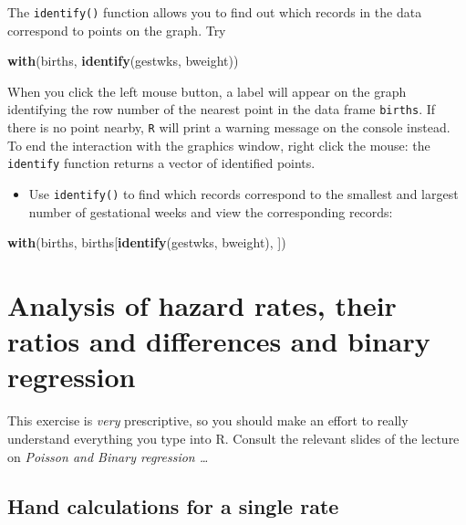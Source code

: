 \documentclass[
]{book}
\newenvironment{Shaded}{\begin{snugshade}}{\end{snugshade}}
\newcommand{\FunctionTok}[1]{\textcolor[rgb]{0.13,0.29,0.53}{\textbf{#1}}}
\newcommand{\NormalTok}[1]{#1}
\providecommand{\tightlist}{%
  \setlength{\itemsep}{0pt}\setlength{\parskip}{0pt}}
\begin{document}
The \texttt{identify()} function allows you to find out which records
in the data correspond to points on the graph. Try

\begin{Shaded}
\begin{Highlighting}[]
\FunctionTok{with}\NormalTok{(births, }\FunctionTok{identify}\NormalTok{(gestwks, bweight))}
\end{Highlighting}
\end{Shaded}

When you click the left mouse button, a label will appear on the graph
identifying the row number of the nearest point in the data frame
\texttt{births}. If there is no point nearby, \texttt{R} will print a warning
message on the console instead. To end the interaction with the
graphics window, right click the mouse: the \texttt{identify} function
returns a vector of identified points.

\begin{itemize}
\tightlist
\item
  Use \texttt{identify()} to find which records correspond to the
  smallest and largest number of gestational weeks and view the
  corresponding records:
\end{itemize}

\begin{Shaded}
\begin{Highlighting}[]
\FunctionTok{with}\NormalTok{(births, births[}\FunctionTok{identify}\NormalTok{(gestwks, bweight), ])}
\end{Highlighting}
\end{Shaded}

\chapter{Analysis of hazard rates, their ratios and differences and binary regression}\label{analysis-of-hazard-rates-their-ratios-and-differences-and-binary-regression}

This exercise is \emph{very} prescriptive, so you should make an
effort to really understand everything you type into R. Consult the
relevant slides of the lecture on \emph{Poisson and Binary regression \ldots{}}

\section{Hand calculations for a single rate}\label{hand-calculations-for-a-single-rate}
\end{document}
